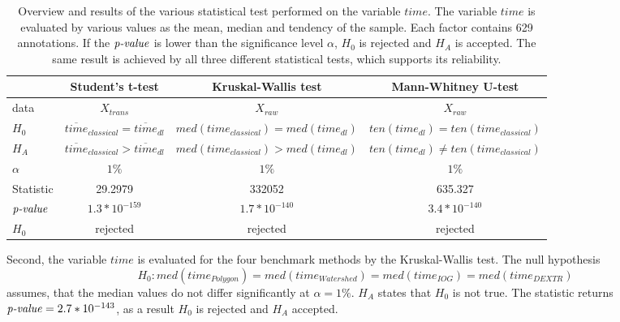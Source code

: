 \begin{table}[h!]
	\centering
	\begin{tabular}{l|c c c}
		\toprule 		
		& Student's t-test	& Kruskal-Wallis test 	& Mann-Whitney U-test \\
		\midrule
		data			& $X_{trans}$		& $X_{raw}$ 	 		& $X_{raw}$ 	\\ 
		$H_{0}$			& $\overline{time}_{classical} = \overline{time}_{dl}$ & $med \left( time_{classical} \right)  = med \left( time_{dl} \right)$ & $ten \left( time_{dl} \right) = ten \left( time_{classical} \right)$ 		\\
		$H_{A}$		 	& $\overline{time}_{classical} > \overline{time}_{dl}$ & $med \left( time_{classical} \right) > med \left( time_{dl} \right) $ & $ten \left( time_{dl} \right) \not= ten \left( time_{classical}\right) $ 	\\
		$\alpha$		& $1\%$ 			& $1\%$ 		 		& $1\%$ 		\\ 	
		Statistic		& 29.2979			& 332052	     		& 635.327    	\\ 
		$\textnormal{\textit{p-value}}$ 
		& $1.3 * 10^{-159}$		& $1.7 * 10^{-140}$ 		 		& $3.4 * 10^{-140}$ 		\\ 
		$H_{0}$		  	& rejected 			& rejected		 		& rejected 		\\
		\bottomrule
	\end{tabular}
	\caption[Hypothesis Tests on $time$]{
		Overview and results of the various statistical test performed on the variable $time$.
		The variable $time$ is evaluated by various values as the mean, median and tendency of the sample.
		Each factor contains 629 annotations.
		If the $\textnormal{\textit{p-value}}$ is lower than the significance level $\alpha$, $H_{0}$ is rejected and $H_{A}$ is accepted.
		The same result is achieved by all three different statistical tests, which supports its reliability.
	}\label{tab:ch5:tests_on_time}
\end{table}
Second, the variable $time$ is evaluated for the four benchmark methods by the Kruskal-Wallis test.
The null hypothesis 
\begin{equation}
	H_{0}: med \left( time_{Polygon} \right) = med \left( time_{Watershed} \right) = med \left( time_{IOG} \right) = med \left( time_{DEXTR} \right)
\end{equation}
assumes, that the median values do not differ significantly at $\alpha=1\%$.
$H_{A}$ states that $H_{0}$ is not true.
The statistic returns $\textnormal{\textit{p-value}}=2.7*10^{-143}$, as a result $H_{0}$ is rejected and $H_{A}$ accepted.

